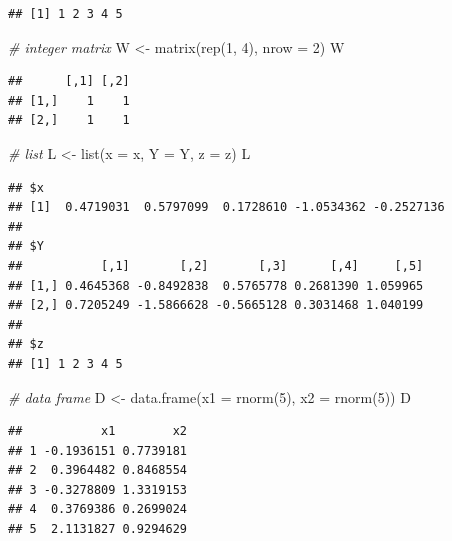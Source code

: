 \documentclass[
]{book}
\newenvironment{Shaded}{\begin{snugshade}}{\end{snugshade}}
\newcommand{\AttributeTok}[1]{\textcolor[rgb]{0.77,0.63,0.00}{#1}}
\newcommand{\CommentTok}[1]{\textcolor[rgb]{0.56,0.35,0.01}{\textit{#1}}}
\newcommand{\DecValTok}[1]{\textcolor[rgb]{0.00,0.00,0.81}{#1}}
\newcommand{\FunctionTok}[1]{\textcolor[rgb]{0.00,0.00,0.00}{#1}}
\newcommand{\NormalTok}[1]{#1}
\newcommand{\OtherTok}[1]{\textcolor[rgb]{0.56,0.35,0.01}{#1}}
\begin{document}
\begin{verbatim}
## [1] 1 2 3 4 5
\end{verbatim}

\begin{Shaded}
\begin{Highlighting}[]
\CommentTok{\# integer matrix}
\NormalTok{W }\OtherTok{\textless{}{-}} \FunctionTok{matrix}\NormalTok{(}\FunctionTok{rep}\NormalTok{(}\DecValTok{1}\NormalTok{, }\DecValTok{4}\NormalTok{), }\AttributeTok{nrow =} \DecValTok{2}\NormalTok{)}
\NormalTok{W}
\end{Highlighting}
\end{Shaded}

\begin{verbatim}
##      [,1] [,2]
## [1,]    1    1
## [2,]    1    1
\end{verbatim}

\begin{Shaded}
\begin{Highlighting}[]
\CommentTok{\# list}
\NormalTok{L }\OtherTok{\textless{}{-}} \FunctionTok{list}\NormalTok{(}\AttributeTok{x =}\NormalTok{ x, }\AttributeTok{Y =}\NormalTok{ Y, }\AttributeTok{z =}\NormalTok{ z)}
\NormalTok{L}
\end{Highlighting}
\end{Shaded}

\begin{verbatim}
## $x
## [1]  0.4719031  0.5797099  0.1728610 -1.0534362 -0.2527136
## 
## $Y
##           [,1]       [,2]       [,3]      [,4]     [,5]
## [1,] 0.4645368 -0.8492838  0.5765778 0.2681390 1.059965
## [2,] 0.7205249 -1.5866628 -0.5665128 0.3031468 1.040199
## 
## $z
## [1] 1 2 3 4 5
\end{verbatim}

\begin{Shaded}
\begin{Highlighting}[]
\CommentTok{\# data frame}
\NormalTok{D }\OtherTok{\textless{}{-}} \FunctionTok{data.frame}\NormalTok{(}\AttributeTok{x1 =} \FunctionTok{rnorm}\NormalTok{(}\DecValTok{5}\NormalTok{), }\AttributeTok{x2 =} \FunctionTok{rnorm}\NormalTok{(}\DecValTok{5}\NormalTok{))}
\NormalTok{D}
\end{Highlighting}
\end{Shaded}

\begin{verbatim}
##           x1        x2
## 1 -0.1936151 0.7739181
## 2  0.3964482 0.8468554
## 3 -0.3278809 1.3319153
## 4  0.3769386 0.2699024
## 5  2.1131827 0.9294629
\end{verbatim}
\end{document}
